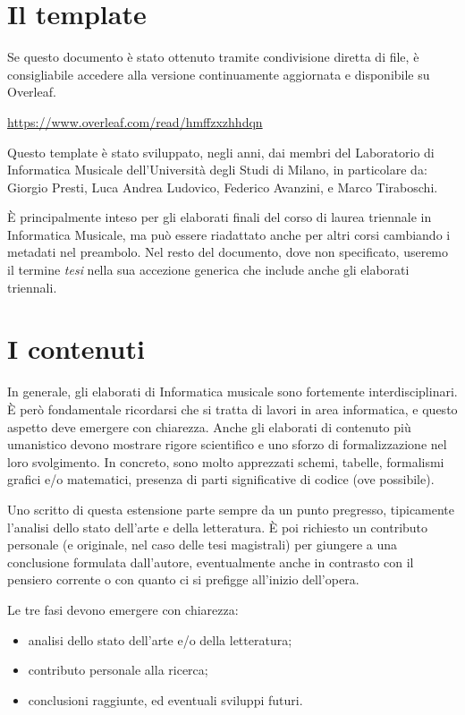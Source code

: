\documentclass[12pt]{report}
\begin{document}
\section{Il template}
Se questo documento è stato ottenuto tramite condivisione diretta di file, è consigliabile accedere alla versione continuamente aggiornata e disponibile su Overleaf. \begin{center}
    \url{https://www.overleaf.com/read/hmffzxzhhdqn}
\end{center}

Questo template è stato sviluppato, negli anni, dai membri del Laboratorio di Informatica Musicale dell'Università degli Studi di Milano, in particolare da: Giorgio Presti, Luca Andrea Ludovico, Federico Avanzini, e Marco Tiraboschi.

È principalmente inteso per gli elaborati finali del corso di laurea triennale in Informatica Musicale, ma può essere riadattato anche per altri corsi cambiando i metadati nel preambolo. Nel resto del documento, dove non specificato, useremo il termine \textit{tesi} nella sua accezione generica che include anche gli elaborati triennali.

\section{I contenuti}
\label{sec:contenuti}

In generale, gli elaborati di Informatica musicale sono fortemente interdisciplinari. \`{E} però fondamentale ricordarsi che si tratta di lavori in area informatica, e questo aspetto deve emergere con chiarezza. Anche gli elaborati di contenuto più umanistico devono mostrare rigore scientifico e uno sforzo di formalizzazione nel loro svolgimento. In concreto, sono molto apprezzati schemi, tabelle, formalismi grafici e/o matematici, presenza di parti significative di codice (ove possibile).

Uno scritto di questa estensione parte sempre da un punto pregresso, tipicamente l'analisi dello stato dell'arte e della letteratura. \`{E} poi richiesto un contributo personale (e originale, nel caso delle tesi magistrali) per giungere a una conclusione formulata dall'autore, eventualmente anche in contrasto con il pensiero corrente o con quanto ci si prefigge all'inizio dell'opera.

Le tre fasi devono emergere con chiarezza:
\begin{itemize}
	\item analisi dello stato dell'arte e/o della letteratura;
	\item contributo personale alla ricerca;
	\item conclusioni raggiunte, ed eventuali sviluppi futuri.
\end{itemize}
\end{document}
